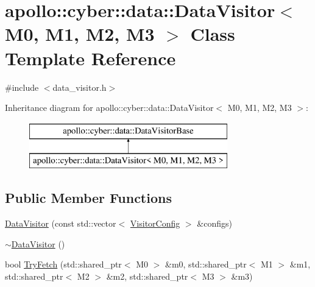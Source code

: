 \hypertarget{classapollo_1_1cyber_1_1data_1_1DataVisitor}{\section{apollo\-:\-:cyber\-:\-:data\-:\-:Data\-Visitor$<$ M0, M1, M2, M3 $>$ Class Template Reference}
\label{classapollo_1_1cyber_1_1data_1_1DataVisitor}
}


{\ttfamily \#include $<$data\-\_\-visitor.\-h$>$}

Inheritance diagram for apollo\-:\-:cyber\-:\-:data\-:\-:Data\-Visitor$<$ M0, M1, M2, M3 $>$\-:\begin{figure}[H]
\begin{center}
\leavevmode
\includegraphics[height=2.000000cm]{classapollo_1_1cyber_1_1data_1_1DataVisitor}
\end{center}
\end{figure}
\subsection*{Public Member Functions}
\begin{DoxyCompactItemize}
\item 
\hyperlink{classapollo_1_1cyber_1_1data_1_1DataVisitor_aa3c92107af063ccb62fc22afc38edc88}{Data\-Visitor} (const std\-::vector$<$ \hyperlink{structapollo_1_1cyber_1_1data_1_1VisitorConfig}{Visitor\-Config} $>$ \&configs)
\item 
\hyperlink{classapollo_1_1cyber_1_1data_1_1DataVisitor_a3e230cff333bf53b0f957b4de5a5bca1}{$\sim$\-Data\-Visitor} ()
\item 
bool \hyperlink{classapollo_1_1cyber_1_1data_1_1DataVisitor_a61ba4cb95ec8fbb5293d76afde794965}{Try\-Fetch} (std\-::shared\-\_\-ptr$<$ M0 $>$ \&m0, std\-::shared\-\_\-ptr$<$ M1 $>$ \&m1, std\-::shared\-\_\-ptr$<$ M2 $>$ \&m2, std\-::shared\-\_\-ptr$<$ M3 $>$ \&m3)
\end{DoxyCompactItemize}
